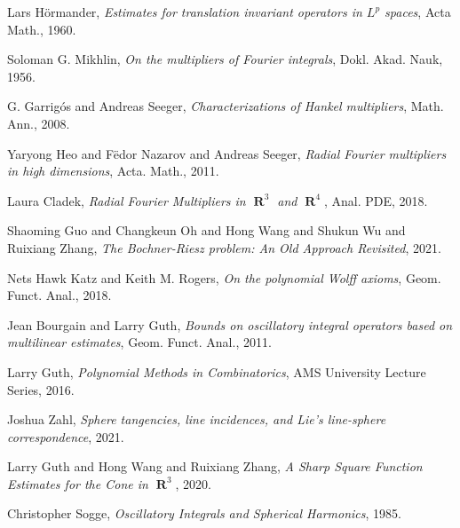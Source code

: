 \documentclass[12pt]{article}
\DeclareMathOperator{\RR}{\mathbf{R}}
\theoremstyle{plain}
\theoremstyle{remark}
\theoremstyle{definition}
\begin{document}
\begin{thebibliography}{9}

    Lars H\"{o}rmander,
    \emph{Estimates for translation invariant operators in $L^p$ spaces},
    Acta Math.,
    1960.

    Soloman G. Mikhlin,
    \emph{On the multipliers of {Fourier} integrals},
    Dokl. Akad. Nauk,
    1956.

    G. Garrig\'{o}s and Andreas Seeger,
    \emph{Characterizations of {Hankel} multipliers},
    Math. Ann.,
    2008.

    Yaryong Heo and F\"{e}dor Nazarov and Andreas Seeger,
    \emph{Radial {Fourier} multipliers in high dimensions},
    Acta. Math.,
    2011.    

    Laura Cladek,
    \emph{Radial {Fourier} Multipliers in $\RR^3$ and $\RR^4$},
    Anal. PDE,
    2018.

    Shaoming Guo and Changkeun Oh and Hong Wang and Shukun Wu and Ruixiang Zhang,
    \emph{The {Bochner}-{Riesz} problem: An Old Approach Revisited},
    2021.

    Nets Hawk Katz and Keith M. Rogers,
    \emph{On the polynomial {Wolff} axioms},
    Geom. Funct. Anal.,
    2018.

    Jean Bourgain and Larry Guth,
    \emph{Bounds on oscillatory integral operators based on multilinear estimates},
    Geom. Funct. Anal.,
    2011.

    Larry Guth,
    \emph{Polynomial Methods in Combinatorics},
    AMS University Lecture Series,
    2016.

    Joshua Zahl,
    \emph{Sphere tangencies, line incidences, and {Lie's} line-sphere correspondence},
    2021.

    Larry Guth and Hong Wang and Ruixiang Zhang,
    \emph{A Sharp Square Function Estimates for the Cone in $\RR^3$},
    2020.

    Christopher Sogge,
    \emph{Oscillatory Integrals and Spherical Harmonics},
    1985.

\end{thebibliography}
\end{document}
